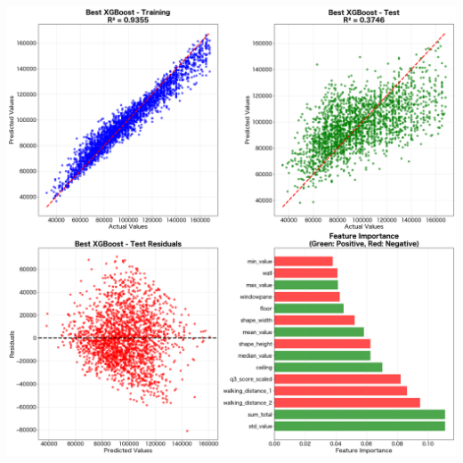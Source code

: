 \documentclass[11pt,a4paper]{article}
\begin{document}
\begin{multicols}{2}
\begin{center}
    \includegraphics[width=0.75\columnwidth]{plots/rent_regression.png}
    \label{fig:rent_regression}
\end{center}



\end{multicols}
\end{document}
